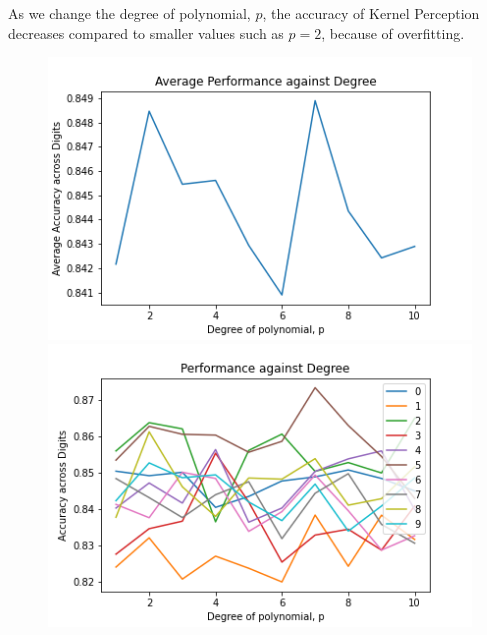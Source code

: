 \documentclass[twoside,11pt]{homework}
\begin{document}
	As we change the degree of polynomial, $p$, the accuracy of Kernel Perception decreases compared to smaller values
	such as $p=2$, because of overfitting.
	\begin{figure}[H]
		\includegraphics[scale=0.5]{q6/img/degree_ker.png}
		\includegraphics[scale=0.5]{q6/img/degree_ker_all.png}
	\end{figure}
\end{document}
